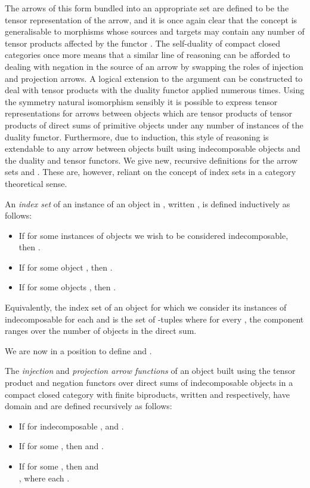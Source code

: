 \documentclass{LMCS}
\theoremstyle{plain}\newtheorem*{cLm}{Claim}
\newcommand{\p}{} \newcommand{\N}{\mathbb{N}}
\begin{document}
The arrows of this form bundled into an appropriate set are defined to be the tensor representation of the arrow, and it is once again clear that the concept is generalisable to morphisms whose sources and targets may contain any number of tensor products affected by the functor . The self-duality of compact closed categories once more means that a similar line of reasoning can be afforded to dealing with negation in the source of an arrow by swapping the roles of injection and projection arrows. A logical extension to the argument can be constructed to deal with tensor products with the duality functor applied numerous times. Using the symmetry natural isomorphism  sensibly it is possible to express tensor representations for arrows between objects which are tensor products of tensor products of direct sums of primitive objects under any number of instances of the duality functor. Furthermore, due to induction, this style of reasoning is extendable to any arrow between objects built using indecomposable objects and the duality and tensor functors. We give new, recursive definitions for the arrow sets  and . These are, however, reliant on the concept of index sets in a category theoretical sense.

\begin{defi} \label{CatTensorIndexSetDefn}
An \emph{index set} of an instance of an object  in , written , is defined inductively as follows:
\begin{itemize}
\item If  for some instances of objects  we wish to be considered indecomposable, then .
\item If  for some object , then .
\item If  for some objects , then .
\end{itemize}\medskip
\end{defi}

Equivalently, the index set of an object  for which we consider its instances of  indecomposable for each  and  is the set of -tuples where for every , the  component ranges over the number of objects in the  direct sum.

\p We are now in a position to define  and .
\begin{defi}
The \emph{injection} and \emph{projection arrow functions} of an object  built using the tensor product and negation functors over direct sums of indecomposable objects in a compact closed category  with finite biproducts, written  and  respectively, have domain  and are defined recursively as follows:
\begin{itemize}
\item If  for indecomposable ,  and .
\item If  for some , then  and .
\item If  for some , then  and \\  , where each .
\end{itemize}\medskip
\end{defi}
\end{document}
